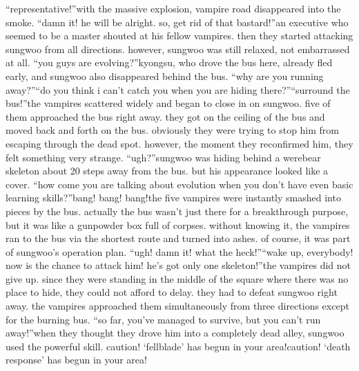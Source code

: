 “representative!”with the massive explosion, vampire road disappeared into the smoke.
“damn it! he will be alright.
 so, get rid of that bastard!”an executive who seemed to be a master shouted at his fellow vampires.
then they started attacking sungwoo from all directions.
 however, sungwoo was still relaxed, not embarrassed at all.
“you guys are evolving?”kyongsu, who drove the bus here, already fled early, and sungwoo also disappeared behind the bus.
“why are you running away?”“do you think i can’t catch you when you are hiding there?”“surround the bus!”the vampires scattered widely and began to close in on sungwoo.
five of them approached the bus right away.
 they got on the ceiling of the bus and moved back and forth on the bus.
 obviously they were trying to stop him from escaping through the dead spot.
 however, the moment they reconfirmed him, they felt something very strange.
“ugh?”sungwoo was hiding behind a werebear skeleton about 20 steps away from the bus.
but his appearance looked like a cover.
“how come you are talking about evolution when you don’t have even basic learning skills?”bang! bang! bang!the five vampires were instantly smashed into pieces by the bus.
actually the bus wasn’t just there for a breakthrough purpose, but it was like a gunpowder box full of corpses.
 without knowing it, the vampires ran to the bus via the shortest route and turned into ashes.
 of course, it was part of sungwoo’s operation plan.
“ugh! damn it! what the heck!”“wake up, everybody! now is the chance to attack him! he’s got only one skeleton!”the vampires did not give up.
 since they were standing in the middle of the square where there was no place to hide, they could not afford to delay.
 they had to defeat sungwoo right away.
the vampires approached them simultaneously from three directions except for the burning bus.
“so far, you’ve managed to survive, but you can’t run away!”when they thought they drove him into a completely dead alley, sungwoo used the powerful skill.
caution! ‘fellblade’ has begun in your area!caution! ‘death response’ has begun in your area!

